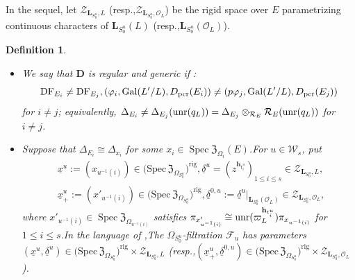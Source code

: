 \documentclass[10pt]{article}
\newtheorem{dfn}[thm]{Definition}
\DeclareMathOperator{\Gal}{Gal}
\DeclareMathOperator{\Spec}{Spec}
\newcommand{\pcr}{{\rm pcr}}
\newcommand{\fil}{{\rm Fil}}
\newcommand{\GLN}{{\rm GL}}
\newcommand{\unr}{{\rm unr}}
\newcommand{\df}{{\mathrm{DF}}}
\newcommand{\dr}{{\rm dR}}
\newcommand{\res}{{\rm Res}}
\newcommand{\Dpik}{{\mathbf{D}}}
\newcommand{\sbanpiku}{{\big(\mathrm{Spec}\hspace{2pt}\FZ_{\Omega_{S^u_0}}\big)^{\mathrm{rig}}}}
\newcommand{\rigchlu}{{\mathcal{Z}_{\bL_{S^u_0},L}}}
\newcommand{\bB}{{\mathbf{B}}}
\newcommand{\bL}{{\mathbf{L}}}
\newcommand{\bP}{{\mathbf{P}}}
\newcommand{\bQ}{{\mathbf{Q}}}
\newcommand{\bh}{{\mathbf{h}}}
\newcommand{\cR}{\mathcal R}
\newcommand{\cF}{\mathcal F}
\newcommand{\cO}{\mathcal O}
\newcommand{\FZ}{{\mathfrak{Z}}}
\newcommand{\sW}{\mathscr W}
\begin{document}
In the sequel, let $\mathcal{Z}_{\bL_{S^u_0},L}$ (resp.,\;$\mathcal{Z}_{\bL_{S^u_0},\cO_L}$) be the rigid space over $E$ parametrizing continuous characters of $\bL_{S^u_0}(L)$ (resp.,\;$\bL_{S^u_0}(\cO_L)$).\;

\begin{dfn}\label{noncriticalassumption}
\begin{itemize}
	\item[(1)] We say that $\Dpik$ is \textit{regular and generic} if :
	\[\df_{E_i}\neq \df_{E_j},(\varphi_i,\Gal(L'/L),D_{\pcr}(E_i))\neq (p\varphi_j,\Gal(L'/L),D_{\pcr}(E_j))\]
	for $i\neq j$; equivalently, $\Delta_{E_i}\neq \Delta_{E_j}(\unr(q_L))=\Delta_{E_j}\otimes_{\cR_{E}}\cR_{E}(\unr(q_L))$ for $i\neq j$.\;
	\item[(2)] Suppose that $\Delta_{E_i}\cong \Delta_{x_i}$ for some $x_i\in \Spec\FZ_{\Omega_{i}}(E)$.\;For $u\in \sW_s$, put
	\begin{equation}
		\begin{aligned}
			&\underline{x}^u:=(x_{u^{-1}(i)})\in \sbanpiku,\underline{\delta}^u=(z^{\bh_{t^u_i}})_{1\leq i\leq s}\in \mathcal{Z}_{\bL_{S^u_0},L},\\
			&\underline{x}^u_+:=(x'_{u^{-1}(i)})\in \sbanpiku,\underline{\delta}^{0,u}:=\underline{\delta}^u|_{\bL_{S^u_0}(\cO_L)}\in \mathcal{Z}_{\bL_{S^u_0},\cO_L},\;
		\end{aligned}
	\end{equation}
	where $x'_{u^{-1}(i)}\in \Spec\FZ_{\Omega_{u^{-1}(i)}}$ satisfies $\pi_{x'_{u^{-1}(i)}}\cong \unr(\varpi_L^{\bh_{t^u_i}})\pi_{x_{u^{-1}(i)}}$ for $1\leq i\leq s$.\;In the language of \cite[Definition 4.1.6]{Ding2021},\;The $\Omega_{S^u_0}$-filtration $\cF_u$ has parameters  $(\underline{x}^u,\underline{\delta}^u)\in \sbanpiku\times\rigchlu$ (resp.,\;$(\underline{x}^u_+,\underline{\delta}^{0,u})\in \sbanpiku\times \mathcal{Z}_{\bL_{S^u_0},\cO_L}$).\;	
\end{itemize}
	
	
	
	

	
\end{dfn}


%
\end{document}
